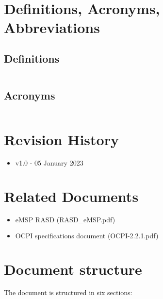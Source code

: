 \section{Definitions, Acronyms, Abbreviations}

\subsection{Definitions}

\begin{tabular}{|p{5cm}|p{10cm}|}
	\hline
	\hline
\end{tabular}

\subsection{Acronyms}
\begin{tabular}{|l|l|}
	\hline
	\hline
\end{tabular}

\section{Revision History}
\begin{itemize}
	\item v1.0 - 05 January 2023
\end{itemize}

\section{Related Documents}
\begin{itemize}
	\item {eMSP RASD (RASD\_eMSP.pdf)}
	\item OCPI specifications document (OCPI-2.2.1.pdf)
\end{itemize}

\section{Document structure}
The document is structured in six sections:

